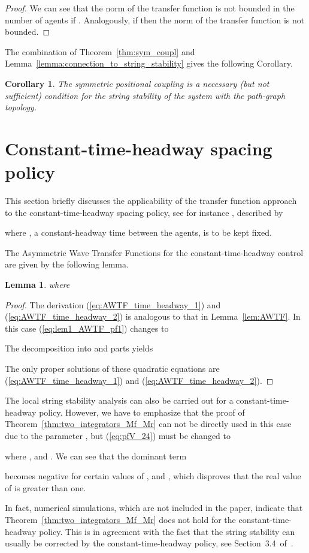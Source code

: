 \documentclass[10pt,twocolumn,twoside]{IEEEtran}
\newtheorem{lemma}{Lemma}
\newtheorem{corollary}{Corollary}
\theoremstyle{definition}
\newcommand{\revB}{Black}
\begin{document}
{\begin{proof}
We can see that the  norm of the transfer function  is not bounded in the number of agents if . Analogously, if  then the  norm of the transfer function  is not bounded.

\end{proof}

The combination of Theorem~\ref{thm:sym_coupl} and Lemma~\ref{lemma:connection_to_string_stability} gives the following Corollary.

\begin{corollary}
  The symmetric positional coupling is a necessary (but not sufficient) condition for the string stability of the system with the path-graph topology.
\end{corollary}}



{\color{\revB}
\section{Constant-time-headway spacing policy}

This section briefly discusses the applicability of the transfer function approach to the constant-time-headway spacing policy, see for instance \cite{Eyre1998a}, described by

where , a constant-headway time between the agents, is to be kept fixed.

The Asymmetric Wave Transfer Functions for the constant-time-headway control are given by the following lemma.
\begin{lemma}
  
where

\end{lemma}
\begin{proof}
  The derivation (\ref{eq:AWTF_time_headway_1}) and (\ref{eq:AWTF_time_headway_2}) is analogous to that in Lemma~\ref{lem:AWTF}. In this case (\ref{eq:lem1_AWTF_pf1}) changes to
  
  The decomposition into  and  parts yields
  
The only proper solutions of these quadratic equations are (\ref{eq:AWTF_time_headway_1}) and (\ref{eq:AWTF_time_headway_2}).
\end{proof}

The local string stability analysis can also be carried out for a constant-time-headway policy. However, we have to emphasize that the proof of Theorem~\ref{thm:two_integrators_Mf_Mr} can not be directly used in this case due to the parameter , but (\ref{eq:pfV_24}) must be changed to

where ,  and . We can see that the dominant term

becomes negative for certain values of ,  and , which disproves that the real value of  is greater than one.

In fact, numerical simulations, which are not included in the paper, indicate that Theorem~\ref{thm:two_integrators_Mf_Mr} does not hold for the constant-time-headway policy. This is in agreement with the fact that the string stability can usually be corrected by the constant-time-headway policy, see Section~3.4~of~\cite{Eyre1998a}.
}
\end{document}
